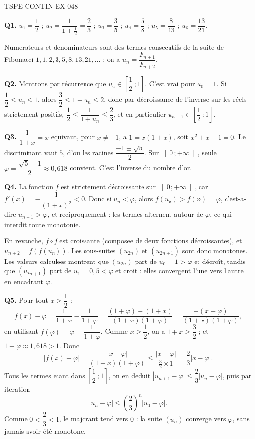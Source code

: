 \begin{corrige}{TSPE-CONTIN-EX-048}

\textbf{Q1.} $u_1 = \dfrac12$ ; $u_2 = \dfrac{1}{1+\frac12} = \dfrac23$ ; $u_3 = \dfrac{3}{5}$ ; $u_4 = \dfrac58$ ; $u_5 = \dfrac{8}{13}$ ; $u_6 = \dfrac{13}{21}$.

Numerateurs et denominateurs sont des termes consecutifs de la suite de Fibonacci $1, 1, 2, 3, 5, 8, 13, 21, \dots$ : on a $u_n = \dfrac{F_{n+1}}{F_{n+2}}$.

\textbf{Q2.} Montrons par récurrence que $u_n \in \left[\dfrac12\,;1\right]$. C'est vrai pour $u_0 = 1$. Si $\dfrac12 \leq u_n \leq 1$, alors $\dfrac32 \leq 1 + u_n \leq 2$, donc par décroissance de l'inverse sur les réels strictement positifs, $\dfrac12 \leq \dfrac{1}{1+u_n} \leq \dfrac23$, et en particulier $u_{n+1} \in \left[\dfrac12\,;1\right]$.

\textbf{Q3.} $\dfrac{1}{1+x} = x$ equivaut, pour $x
\neq -1$, a $1 = x(1+x)$, soit $x^2 + x - 1 = 0$. Le discriminant vaut $5$, d'ou les racines $\dfrac{-1 \pm \sqrt5}{2}$. Sur $\left]0\,;+\infty\right[$, seule $\varphi = \dfrac{\sqrt5 - 1}{2} \approx 0{,}618$ convient. C'est l'inverse du nombre d'or.

\textbf{Q4.} La fonction $f$ est strictement décroissante sur $\left]0\,;+\infty\right[$, car $f'(x) = -\dfrac{1}{(1+x)^2} < 0$. Donc si $u_n < \varphi$, alors $f(u_n) > f(\varphi) = \varphi$, c'est-a-dire $u_{n+1} > \varphi$, et reciproquement : les termes alternent autour de $\varphi$, ce qui interdit toute monotonie.

En revanche, $f \circ f$ est croissante (composee de deux fonctions décroissantes), et $u_{n+2} = f(f(u_n))$. Les sous-suites $(u_{2n})$ et $(u_{2n+1})$ sont donc monotones. Les valeurs calculees montrent que $(u_{2n})$ part de $u_0 = 1 > \varphi$ et décroît, tandis que $(u_{2n+1})$ part de $u_1 = 0{,}5 < \varphi$ et croit : elles convergent l'une vers l'autre en encadrant $\varphi$.

\textbf{Q5.} Pour tout $x \geq \dfrac12$ :
\[ f(x) - \varphi = \frac{1}{1+x} - \frac{1}{1+\varphi} = \frac{(1+\varphi) - (1+x)}{(1+x)(1+\varphi)} = \frac{-(x - \varphi)}{(1+x)(1+\varphi)}, \]
en utilisant $f(\varphi) = \varphi = \dfrac{1}{1+\varphi}$. Comme $x \geq \dfrac12$, on a $1 + x \geq \dfrac32$ ; et $1 + \varphi \approx 1{,}618 > 1$. Donc
\[ \left|f(x) - \varphi\right| = \frac{|x - \varphi|}{(1+x)(1+\varphi)} \leq \frac{|x-\varphi|}{\frac32 \times 1} = \frac{2}{3}\left|x - \varphi\right|. \]
Tous les termes etant dans $\left[\dfrac12\,;1\right]$, on en deduit $\left|u_{n+1} - \varphi\right| \leq \dfrac23\left|u_n - \varphi\right|$, puis par iteration
\[ \left|u_n - \varphi\right| \leq \left(\frac23\right)^{n}\left|u_0 - \varphi\right|. \]
Comme $0 < \dfrac23 < 1$, le majorant tend vers $0$ : la suite $(u_n)$ converge vers $\varphi$, sans jamais avoir été monotone.
\end{corrige}
